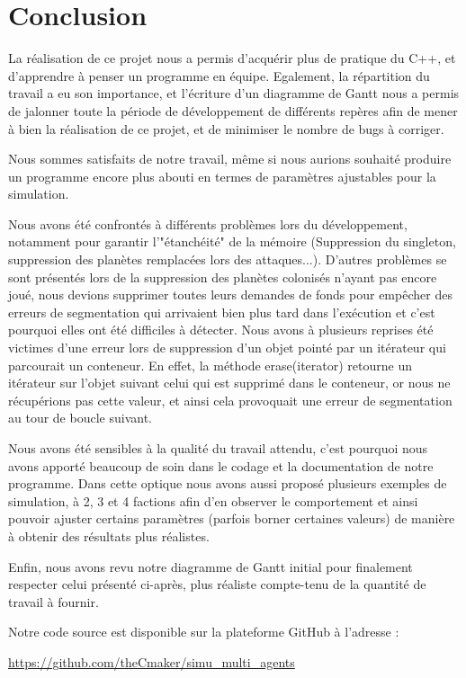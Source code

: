 \chapter{Conclusion}

    La réalisation de ce projet nous a permis d'acquérir plus de pratique du C++, et d'apprendre à penser un programme en équipe. Egalement, la répartition du travail a eu son importance, et l'écriture d'un diagramme de Gantt nous a permis de jalonner toute la période de développement de différents repères afin de mener à bien la réalisation de ce projet, et de minimiser le nombre de bugs à corriger.

    Nous sommes satisfaits de notre travail, même si nous aurions souhaité produire un programme encore plus abouti en termes de paramètres ajustables pour la simulation.

    Nous avons été confrontés à différents problèmes lors du développement, notamment pour garantir l'"étanchéité" de la mémoire (Suppression du singleton, suppression des planètes remplacées lors des attaques...). D'autres problèmes se sont présentés lors de la suppression des planètes colonisés n'ayant pas encore joué, nous devions supprimer toutes leurs demandes de fonds pour empêcher des erreurs de segmentation qui arrivaient bien plus tard dans l'exécution et c'est pourquoi elles ont été difficiles à détecter. 
    Nous avons à plusieurs reprises été victimes d’une erreur lors de suppression d’un objet pointé par un itérateur qui parcourait un conteneur. En effet, la méthode erase(iterator) retourne un itérateur sur l’objet suivant celui qui est supprimé dans le conteneur, or nous ne récupérions pas cette valeur, et ainsi cela provoquait une erreur de segmentation au tour de boucle suivant.

    Nous avons été sensibles à la qualité du travail attendu, c’est pourquoi nous avons apporté beaucoup de soin dans le codage et la documentation de notre programme. Dans cette optique nous avons aussi proposé plusieurs exemples de simulation, à 2, 3 et 4 factions afin d’en observer le comportement et ainsi pouvoir ajuster certains paramètres (parfois borner certaines valeurs) de manière à obtenir des résultats plus réalistes.
    
    Enfin, nous avons revu notre diagramme de Gantt initial pour finalement respecter celui présenté ci-après, plus réaliste compte-tenu de la quantité de travail à fournir.

    \begin{center}
        
    \end{center}

    \vfill 
    Notre code source est disponible sur la plateforme GitHub à l'adresse :
    \begin{center}
      \href{https://github.com/theCmaker/simu\_multi\_agents}{https://github.com/theCmaker/simu\_multi\_agents}
    \end{center}
    \vfill \null